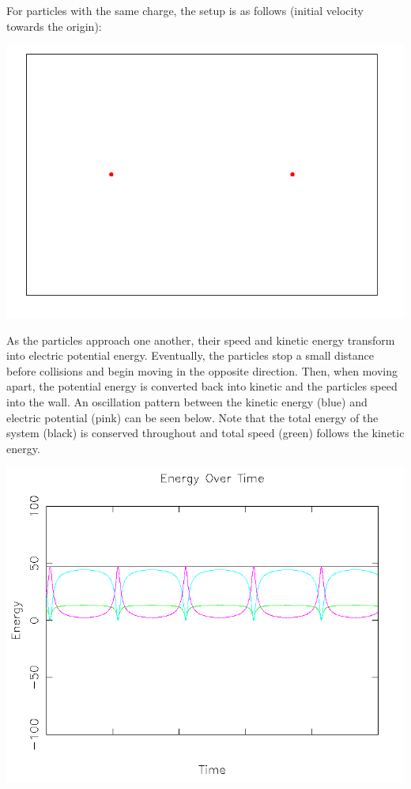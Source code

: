 \documentclass{article}
\begin{document}
For particles with the same charge, the setup is as follows (initial velocity towards the origin):
\\
\begin{center}
    \includegraphics[scale=0.5]{charged_2_same}
\end{center}

As the particles approach one another, their speed and kinetic energy transform into electric potential energy.
Eventually, the particles stop a small distance before collisions and begin moving in the opposite direction.
Then, when moving apart, the potential energy is converted back into kinetic and the particles speed into the wall.
An oscillation pattern between the kinetic energy (blue) and electric potential (pink) can be seen below.
Note that the total energy of the system (black) is conserved throughout and total speed (green) follows the kinetic energy.
\\
\begin{center}
    \includegraphics[scale=0.5]{charged_2_same_energy}
\end{center}
\end{document}

